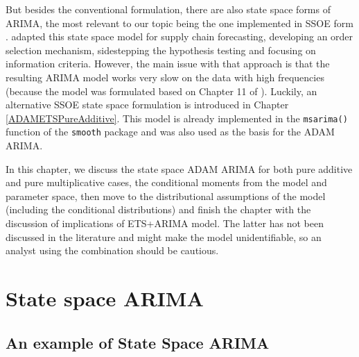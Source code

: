 \documentclass[
]{book}
\theoremstyle{definition}
\theoremstyle{definition}
\theoremstyle{definition}
\theoremstyle{definition}
\theoremstyle{remark}
\begin{document}
But besides the conventional formulation, there are also state space forms of ARIMA, the most relevant to our topic being the one implemented in SSOE form \citep[Chapter 11 of][]{Hyndman2008b}. \citet{Svetunkov2019} adapted this state space model for supply chain forecasting, developing an order selection mechanism, sidestepping the hypothesis testing and focusing on information criteria. However, the main issue with that approach is that the resulting ARIMA model works very slow on the data with high frequencies (because the model was formulated based on Chapter 11 of \citet{Hyndman2008b}). Luckily, an alternative SSOE state space formulation is introduced in Chapter \ref{ADAMETSPureAdditive}. This model is already implemented in the \texttt{msarima()} function of the \texttt{smooth} package and was also used as the basis for the ADAM ARIMA.

In this chapter, we discuss the state space ADAM ARIMA for both pure additive and pure multiplicative cases, the conditional moments from the model and parameter space, then move to the distributional assumptions of the model (including the conditional distributions) and finish the chapter with the discussion of implications of ETS+ARIMA model. The latter has not been discussed in the literature and might make the model unidentifiable, so an analyst using the combination should be cautious.

\hypertarget{StateSpaceARIMA}{%
\section{State space ARIMA}\label{StateSpaceARIMA}}

\hypertarget{an-example-of-state-space-arima}{%
\subsection{An example of State Space ARIMA}\label{an-example-of-state-space-arima}}
\end{document}
